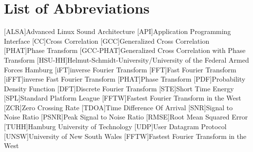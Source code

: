 \chapter*{List of Abbreviations}
\label{sec:abbreviations}

\begin{acronym}[HSU-HH]
  [ALSA]{Advanced Linux Sound Architecture}
  [API]{Application Programming Interface}
  [CC]{Cross Correlation}
  [GCC]{Generalized Cross Correlation}
  [PHAT]{Phase Transform}
  [GCC-PHAT]{Generalized Cross Correlation with Phase Transform}
  [HSU-HH]{Helmut-Schmidt-University/University of the Federal Armed Forces Hamburg}
  [iFT]{inverse Fourier Transform}
  [FFT]{Fast Fourier Transform}
  [iFFT]{inverse Fast Fourier Transform}
  [PHAT]{Phase Transform}
  [PDF]{Probability Density Function}
  [DFT]{Discrete Fourier Transform}
  [STE]{Short Time Energy}
  [SPL]{Standard Platform League}
  [FFTW]{Fastest Fourier Transform in the West}
  [ZCR]{Zero Crossing Rate}
  [TDOA]{Time Difference Of Arrival}
  [SNR]{Signal to Noise Ratio}
  [PSNR]{Peak Signal to Noise Ratio}
  [RMSE]{Root Mean Squared Error}
  [TUHH]{Hamburg University of Technology}
  [UDP]{User Datagram Protocol}
  [UNSW]{University of New South Wales}
  [FFTW]{Fastest Fourier Transform in the West}
\end{acronym}
